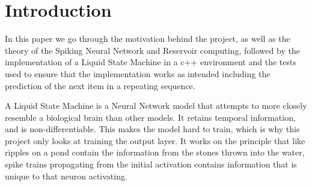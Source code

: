 \chapter{Introduction}

In this paper we go through the motivation behind the project, as well as the theory of the Spiking Neural Network and Reservoir computing, followed by the implementation of a Liquid State Machine in a c++ environment and the tests used to ensure that the implementation works as intended including the prediction of the next item in a repeating sequence.

A Liquid State Machine is a Neural Network model that attempts to more closely resemble a biological brain than other models. It retains temporal information, and is non-differentiable. This makes the model hard to train, which is why this project only looks at training the output layer. It works on the principle that like ripples on a pond contain the information from the stones thrown into the water, spike trains propagating from the initial activation contains information that is unique to that neuron activating.

